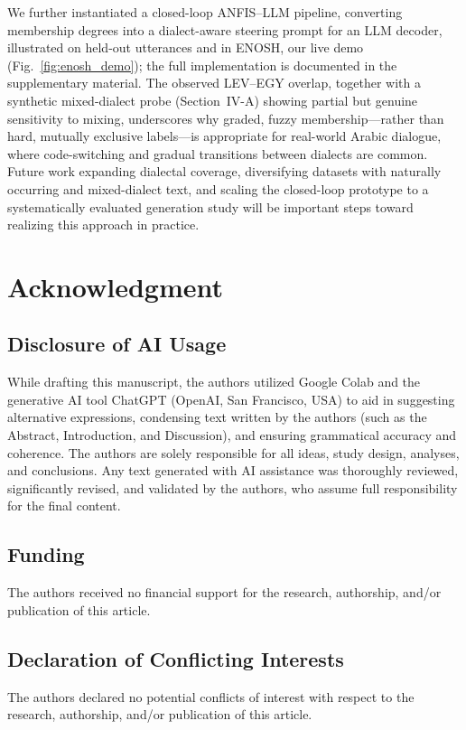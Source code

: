 \documentclass[conference]{IEEEtran}
\begin{document}
We further instantiated a closed-loop ANFIS--LLM pipeline, converting membership degrees into a dialect-aware steering prompt for an LLM decoder, illustrated on held-out utterances and in ENOSH, our live demo (Fig.~\ref{fig:enosh_demo}); the full implementation is documented in the supplementary material. The observed LEV--EGY overlap, together with a synthetic mixed-dialect probe (Section~IV-A) showing partial but genuine sensitivity to mixing, underscores why graded, fuzzy membership---rather than hard, mutually exclusive labels---is appropriate for real-world Arabic dialogue, where code-switching and gradual transitions between dialects are common. Future work expanding dialectal coverage, diversifying datasets with naturally occurring and mixed-dialect text, and scaling the closed-loop prototype to a systematically evaluated generation study will be important steps toward realizing this approach in practice.

\section*{Acknowledgment}
\subsection*{Disclosure of AI Usage}
While drafting this manuscript, the authors utilized Google Colab and the generative AI tool ChatGPT (OpenAI, San Francisco, USA) to aid in suggesting alternative expressions, condensing text written by the authors (such as the Abstract, Introduction, and Discussion), and ensuring grammatical accuracy and coherence. The authors are solely responsible for all ideas, study design, analyses, and conclusions. Any text generated with AI assistance was thoroughly reviewed, significantly revised, and validated by the authors, who assume full responsibility for the final content.

\subsection*{Funding}
The authors received no financial support for the research, authorship, and/or publication of this article.

\subsection*{Declaration of Conflicting Interests}
The authors declared no potential conflicts of interest with respect to the research, authorship, and/or publication of this article.
\end{document}
